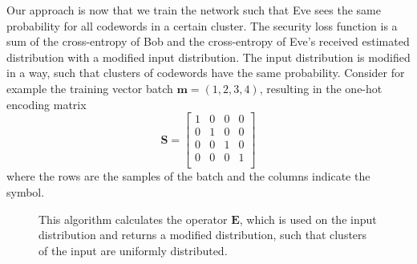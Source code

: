 \documentclass[conference]{IEEEtran}
\makeatletter
\newcommand{\removelatexerror}{\let\@latex@error\@gobble}
\makeatother
\begin{document}
Our approach is now that we train the network such that Eve sees the same probability for all codewords in a certain cluster. The security loss function is a sum of the cross-entropy of Bob and the cross-entropy of Eve's received estimated distribution with a modified input distribution. The input distribution is modified in a way, such that clusters of codewords have the same probability. Consider for example the training vector batch $\mathbf{m}=(1,2,3,4)$, resulting in the one-hot encoding matrix
\begin{equation}
\mathbf{S}=
  \begin{bmatrix}
    1 & 0 & 0 & 0 \\
    0 & 1 & 0 & 0 \\
    0 & 0 & 1 & 0 \\
    0 & 0 & 0 & 1 \\
  \end{bmatrix}\end{equation} where the rows are the samples of the batch and the columns indicate the symbol.

\begin{figure}[!t]
 \removelatexerror
{
\begin{algorithm}[H]
    \LinesNumberedHidden
    \caption{This algorithm calculates the operator $\mathbf{E}$, which is used on the input distribution and returns a modified distribution, such that clusters of the input are uniformly distributed.}
    \label{algo:label_equalization}
\end{algorithm}
}
\end{figure}
\end{document}
